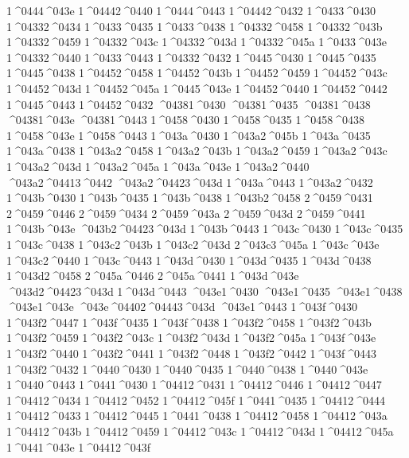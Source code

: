 {1^^^^0444^^^^043e
1^^^^04442^^^^0440
1^^^^0444^^^^0443
1^^^^04442^^^^0432
1^^^^0433^^^^0430
1^^^^04332^^^^0434
1^^^^0433^^^^0435
1^^^^0433^^^^0438
1^^^^04332^^^^0458
1^^^^04332^^^^043b
1^^^^04332^^^^0459
1^^^^04332^^^^043c
1^^^^04332^^^^043d
1^^^^04332^^^^045a
1^^^^0433^^^^043e
1^^^^04332^^^^0440
1^^^^0433^^^^0443
1^^^^04332^^^^0432
1^^^^0445^^^^0430
1^^^^0445^^^^0435
1^^^^0445^^^^0438
1^^^^04452^^^^0458
1^^^^04452^^^^043b
1^^^^04452^^^^0459
1^^^^04452^^^^043c
1^^^^04452^^^^043d
1^^^^04452^^^^045a
1^^^^0445^^^^043e
1^^^^04452^^^^0440
1^^^^04452^^^^0442
1^^^^0445^^^^0443
1^^^^04452^^^^0432
^^^^04381^^^^0430
^^^^04381^^^^0435
^^^^04381^^^^0438
^^^^04381^^^^043e
^^^^04381^^^^0443
1^^^^0458^^^^0430
1^^^^0458^^^^0435
1^^^^0458^^^^0438
1^^^^0458^^^^043e
1^^^^0458^^^^0443
1^^^^043a^^^^0430
1^^^^043a2^^^^045b
1^^^^043a^^^^0435
1^^^^043a^^^^0438
1^^^^043a2^^^^0458
1^^^^043a2^^^^043b
1^^^^043a2^^^^0459
1^^^^043a2^^^^043c
1^^^^043a2^^^^043d
1^^^^043a2^^^^045a
1^^^^043a^^^^043e
1^^^^043a2^^^^0440
^^^^043a2^^^^04413^^^^0442
^^^^043a2^^^^04423^^^^043d
1^^^^043a^^^^0443
1^^^^043a2^^^^0432
1^^^^043b^^^^0430
1^^^^043b^^^^0435
1^^^^043b^^^^0438
1^^^^043b2^^^^0458
2^^^^0459^^^^0431
2^^^^0459^^^^0446
2^^^^0459^^^^0434
2^^^^0459^^^^043a
2^^^^0459^^^^043d
2^^^^0459^^^^0441
1^^^^043b^^^^043e
^^^^043b2^^^^04423^^^^043d
1^^^^043b^^^^0443
1^^^^043c^^^^0430
1^^^^043c^^^^0435
1^^^^043c^^^^0438
1^^^^043c2^^^^043b
1^^^^043c2^^^^043d
2^^^^043c3^^^^045a
1^^^^043c^^^^043e
1^^^^043c2^^^^0440
1^^^^043c^^^^0443
1^^^^043d^^^^0430
1^^^^043d^^^^0435
1^^^^043d^^^^0438
1^^^^043d2^^^^0458
2^^^^045a^^^^0446
2^^^^045a^^^^0441
1^^^^043d^^^^043e
^^^^043d2^^^^04423^^^^043d
1^^^^043d^^^^0443
^^^^043e1^^^^0430
^^^^043e1^^^^0435
^^^^043e1^^^^0438
^^^^043e1^^^^043e
^^^^043e^^^^04402^^^^04443^^^^043d
^^^^043e1^^^^0443
1^^^^043f^^^^0430
1^^^^043f2^^^^0447
1^^^^043f^^^^0435
1^^^^043f^^^^0438
1^^^^043f2^^^^0458
1^^^^043f2^^^^043b
1^^^^043f2^^^^0459
1^^^^043f2^^^^043c
1^^^^043f2^^^^043d
1^^^^043f2^^^^045a
1^^^^043f^^^^043e
1^^^^043f2^^^^0440
1^^^^043f2^^^^0441
1^^^^043f2^^^^0448
1^^^^043f2^^^^0442
1^^^^043f^^^^0443
1^^^^043f2^^^^0432
1^^^^0440^^^^0430
1^^^^0440^^^^0435
1^^^^0440^^^^0438
1^^^^0440^^^^043e
1^^^^0440^^^^0443
1^^^^0441^^^^0430
1^^^^04412^^^^0431
1^^^^04412^^^^0446
1^^^^04412^^^^0447
1^^^^04412^^^^0434
1^^^^04412^^^^0452
1^^^^04412^^^^045f
1^^^^0441^^^^0435
1^^^^04412^^^^0444
1^^^^04412^^^^0433
1^^^^04412^^^^0445
1^^^^0441^^^^0438
1^^^^04412^^^^0458
1^^^^04412^^^^043a
1^^^^04412^^^^043b
1^^^^04412^^^^0459
1^^^^04412^^^^043c
1^^^^04412^^^^043d
1^^^^04412^^^^045a
1^^^^0441^^^^043e
1^^^^04412^^^^043f
}
